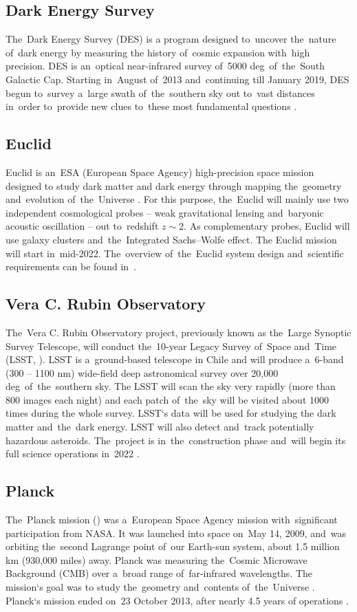 \subsection{Dark Energy Survey}
The~Dark Energy Survey (DES) is a program designed to~uncover the~nature of~dark energy by measuring the history of~cosmic expansion with~high precision. DES is an~optical near-infrared survey of~5000 deg\sq\ of~the~South Galactic Cap. Starting in~August of~2013 and~continuing till January 2019, DES begun to~survey a~large swath of~the~southern sky out to~vast distances in~order to~provide new clues to~these most fundamental questions \parencite{DES}.
\subsection{Euclid}
Euclid is an~ESA (European Space Agency) high-precision space mission designed to study dark matter and dark energy through mapping the~geometry and~evolution of~the~Universe \parencite{euclid,2010arXiv1001.0061R}. For this purpose, the~Euclid will mainly use two independent cosmological probes -- weak gravitational lensing and~baryonic acoustic oscillation -- out to~redshift $z\sim2$. As complementary probes, Euclid will use galaxy clusters and~the~Integrated Sachs--Wolfe effect. The Euclid mission will start in~mid-2022. The~overview of~the~Euclid system design and~scientific requirements can be found in~\cite{2011arXiv1110.3193L}.
\subsection{Vera C. Rubin Observatory}
The~Vera C. Rubin Observatory project, previously known as the~Large Synoptic Survey Telescope, will conduct the~10-year Legacy Survey of~Space and~Time (LSST, \cite{lsst}). LSST is a~ground-based telescope in Chile and will produce a~6-band (300 -- 1100 nm) wide-field deep astronomical survey over 20,000 deg\sq\ of~the~southern sky. The LSST will scan the sky very rapidly (more than 800 images each night) and each patch of~the~sky will be visited about 1000 times during the whole survey. LSST`s data will be used for studying the dark matter and~the~dark energy. LSST will also detect and~track potentially hazardous asteroids. The~project is in~the~construction phase and~will begin its full science operations in~2022 \parencite{lsst_web}.
\subsection{Planck}
The~Planck mission (\cite{planck}) was a~European Space Agency mission with~significant participation from NASA. It was launched into space on~May 14, 2009, and~was orbiting the~second Lagrange point of~our Earth-sun system, about 1.5 million km (930,000 miles) away. Planck was measuring the~Cosmic Microwave Background (CMB) over a~broad range of~far-infrared wavelengths. The mission`s goal was to study the~geometry and~contents of~the~Universe \parencite[for results, see][]{planck_cosm}. Planck`s mission ended on~23 October 2013, after nearly 4.5 years of operations \parencite{planck_web}.
